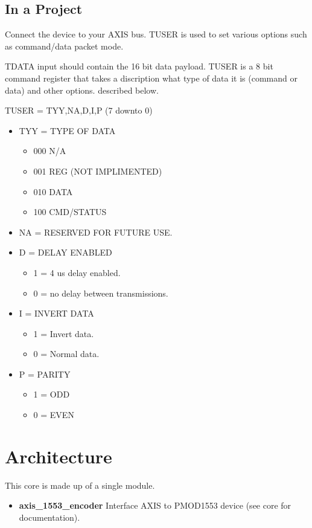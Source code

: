

\subsection{In a Project}
\par
Connect the device to your AXIS bus. TUSER is used to set various options such as command/data packet mode.

\par
TDATA input should contain the 16 bit data payload. TUSER is a 8 bit command register
that takes a discription what type of data it is (command or data) and other options.
described below.

TUSER = {TYY,NA,D,I,P} (7 downto 0)
\begin{itemize}
\item TYY = TYPE OF DATA
  \begin{itemize}
    \item 000 N/A
    \item 001 REG (NOT IMPLIMENTED)
    \item 010 DATA
    \item 100 CMD/STATUS
  \end{itemize}
  \item NA = RESERVED FOR FUTURE USE.
  \item D = DELAY ENABLED
  \begin{itemize}
    \item 1 = 4 us delay enabled.
    \item 0 = no delay between transmissions.
  \end{itemize}
  \item I = INVERT DATA
  \begin{itemize}
    \item 1 = Invert data.
    \item 0 = Normal data.
  \end{itemize}
  \item P = PARITY
  \begin{itemize}
    \item 1 = ODD
    \item 0 = EVEN
  \end{itemize}
\end{itemize}

\section{Architecture}
\par
This core is made up of a single module.
\begin{itemize}
  \item \textbf{axis\_1553\_encoder} Interface AXIS to PMOD1553 device (see core for documentation).
\end{itemize}


